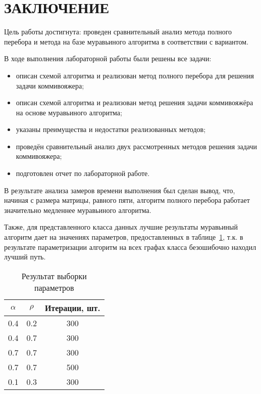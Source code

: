 \section*{ЗАКЛЮЧЕНИЕ}

Цель работы достигнута: проведен сравнительный анализ метода полного перебора и метода на базе муравьиного алгоритма в соответствии с вариантом.

В ходе выполнения лабораторной работы были решены все задачи:
\begin{itemize}[label*=---]
	\item описан схемой алгоритма и реализован метод полного перебора для решения задачи коммивояжера;
	\item описан схемой алгоритма и реализован метод решения задачи коммивояжёра на основе муравьиного алгоритма;
	\item указаны преимущества и недостатки реализованных методов;
	\item проведён сравнительный анализ двух рассмотренных методов решения задачи коммивояжера;
	\item подготовлен отчет по лабораторной работе.
\end{itemize}

В результате анализа замеров времени выполнения был сделан вывод, что, начиная с размера матрицы, равного пяти, алгоритм полного перебора работает значительно медленнее муравьиного алгоритма.

Также, для представленного класса данных лучшие результаты муравьиный алгоритм дает на значениях параметров, предоставленных в таблице~\ref{tab:res}, т.к. в результате параметризации алгоритм на всех графах класса безошибочно находил лучший путь.
\begin{table}[hbtp]
	\centering
	\caption{Результат выборки параметров}
	\label{tab:res}
	\begin{tabular}{|c|c|c|}
		\hline
		\textbf{$\alpha$} & \textbf{$\rho$} & {Итерации, шт.} \\
		\hline
		0.4 & 0.2 & 300 \\
		0.4 & 0.7 & 300 \\
		0.7 & 0.7 & 300 \\
		0.7 & 0.7 & 500 \\
		0.1 & 0.3 & 300 \\
		\hline
	\end{tabular}
\end{table}